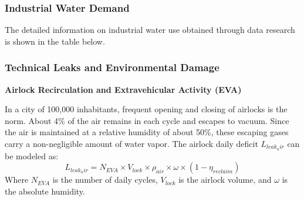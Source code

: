 \subsubsection{Industrial Water Demand}
The detailed information on industrial water use obtained through data research is shown in the table below.
\begin{table}[htbp]
\centering
\caption{Industrial and Public Utility Water Consumption Indicators}
\label{tab:industrial_water}

\end{table}
\FloatBarrier

\subsubsection{Technical Leaks and Environmental Damage}
\medskip
\noindent\textbf{Airlock Recirculation and Extravehicular Activity (EVA)}\par
In a city of 100,000 inhabitants, frequent opening and closing of airlocks is the norm. About 4\% of the air remains in each cycle and escapes to vacuum.
Since the air is maintained at a relative humidity of about 50\%, these escaping gases carry a non-negligible amount of water vapor.
The airlock daily deficit $L_{leak_air}$ can be modeled as:
\[L_{leak_air}=N_{EVA}\times V_{lock}\times\rho_{air}\times\omega\times(1-\eta_{reclaim})\]
\indent Where $N_{EVA}$ is the number of daily cycles, $V_{lock}$ is the airlock volume, and $\omega$ is the absolute humidity.\\

